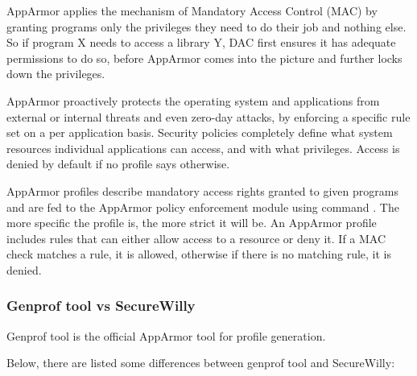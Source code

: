 AppArmor applies the mechanism of Mandatory Access Control (MAC) by granting programs only the privileges they need to do their job and nothing else. So if program X needs to access a library Y, DAC first ensures it has adequate permissions to do so, before AppArmor comes into the picture and further locks down the privileges.\cite{appsel}

AppArmor proactively protects the operating system and applications from external or internal threats and even zero-day attacks, by enforcing a specific rule set on a per application basis. Security policies completely define what system resources individual applications can access, and with what privileges. Access is denied by default if no profile says otherwise. \cite{archlsm}

AppArmor profiles describe mandatory access rights granted to given programs and are fed to the AppArmor policy enforcement module using command . The more specific the profile is, the more strict it will be. An AppArmor profile includes rules that can either allow access to a resource or deny it. If a MAC check matches a rule, it is allowed, otherwise if there is no matching rule, it is denied.

\subsubsection{Genprof tool vs SecureWilly}

Genprof tool is the official AppArmor tool for profile generation.

Below, there are listed some differences between genprof tool and SecureWilly:

